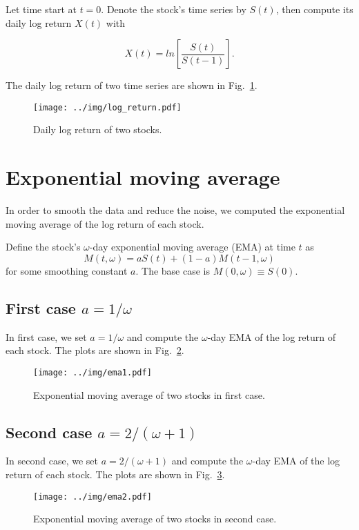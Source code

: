 \documentclass[runningheads]{llncs}
\begin{document}
Let time start at $t = 0$. Denote the stock's time series by $S(t)$, then compute its daily log return $X(t)$ with

\begin{equation}
    X(t) = ln \left[\frac{S(t)}{S(t-1)}\right].
\end{equation}

The daily log return of two time series are shown in Fig.~\ref{fig:log_return}.

\begin{figure}
    \centering
    \texttt{[image: ../img/log\_return.pdf]}
    \caption{Daily log return of two stocks.}
    \label{fig:log_return}
\end{figure}

\section{Exponential moving average}
In order to smooth the data and reduce the noise, we computed the exponential moving average of the log return of each stock.

Define the stock's $\omega$-day exponential moving average (EMA) at time $t$ as
$$
    M(t, \omega) = aS(t) + (1 - a)M(t - 1, \omega)
$$
for some smoothing constant $a$. The base case is $M(0, \omega) ≡ S(0)$.

\subsection{First case $a=1/\omega$}

In first case, we set $a = 1/\omega$ and compute the $\omega$-day EMA of the log return of each stock.
The plots are shown in Fig.~\ref{fig:ema1}.

\begin{figure}
    \centering
    \texttt{[image: ../img/ema1.pdf]}
    \caption{Exponential moving average of two stocks in first case.}
    \label{fig:ema1}
\end{figure}

\subsection{Second case $a=2/(\omega + 1)$}

In second case, we set $a = 2/(\omega + 1)$ and compute the $\omega$-day EMA of the log return of each stock.
The plots are shown in Fig.~\ref{fig:ema2}.

\begin{figure}
    \centering
    \texttt{[image: ../img/ema2.pdf]}
    \caption{Exponential moving average of two stocks in second case.}
    \label{fig:ema2}
\end{figure}
\end{document}
